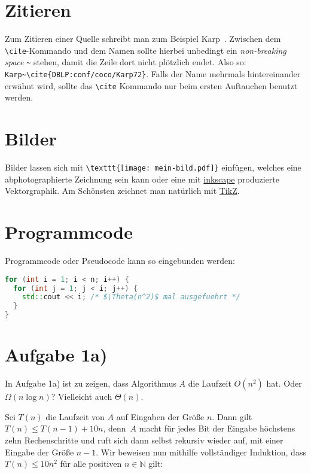 \documentclass[a4paper,11pt,oneside,ngerman]{scrartcl}
\theoremstyle{plain}
\theoremstyle{definition}
\begin{document}
\section*{Zitieren}

Zum Zitieren einer Quelle schreibt man zum Beispiel Karp~\cite{DBLP:conf/coco/Karp72}.
Zwischen dem \verb|\cite|-Kommando und dem Namen sollte hierbei unbedingt ein \textit{non-breaking space} \verb|~| stehen, damit die Zeile dort nicht plötzlich endet. Also so: \verb|Karp~\cite{DBLP:conf/coco/Karp72}|. Falls der Name mehrmals hintereinander erwähnt wird, sollte das \verb|\cite| Kommando nur beim ersten Auftauchen benutzt werden.


\section*{Bilder}

Bilder lassen sich mit \verb|\texttt{[image: mein-bild.pdf]}| einfügen, welches eine abphotographierte Zeichnung sein kann oder eine mit \href{https://inkscape.org/}{inkscape} produzierte Vektorgraphik. Am Schönsten zeichnet man natürlich mit \href{https://www.overleaf.com/learn/latex/TikZ_package/}{TikZ}.


\section*{Programmcode}

Programmcode oder Pseudocode kann so eingebunden werden:
\begin{lstlisting}[language=C++]
for (int i = 1; i < n; i++) {
  for (int j = 1; j < i; j++) {
    std::cout << i; /* $\Theta(n^2)$ mal ausgefuehrt */
  }
}
\end{lstlisting}


\section*{Aufgabe 1a)}

In Aufgabe 1a) ist zu zeigen, dass Algorithmus $A$ die Laufzeit $O(n^2)$ hat. Oder $\Omega(n\log n)$? Vielleicht auch $\Theta(n)$.

Sei $T(n)$ die Laufzeit von $A$ auf Eingaben der Größe $n$.
Dann gilt $T(n)\le T(n-1) + 10n$, denn~$A$ macht für jedes Bit der Eingabe höchstens zehn Rechenschritte und ruft sich dann selbst rekursiv wieder auf, mit einer Eingabe der Größe $n-1$. Wir beweisen nun mithilfe vollständiger Induktion, dass $T(n)\le 10n^2$ für alle positiven $n\in\mathbb{N}$ gilt:
\end{document}

